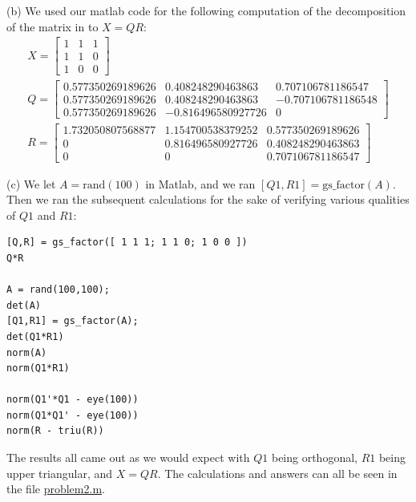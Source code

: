 \documentclass[12pt]{amsart}
\begin{document}
\begin{onehalfspace}
        (b) We used our matlab code for the following computation of the decomposition of the matrix in to $X=QR$:
        \begin{gather*}
            X  =  \left[\begin{matrix}
                          1 & 1 & 1\\
                          1 & 1 & 0\\
                          1 & 0 & 0
            \end{matrix}\right] \\
            Q  =  \left[\begin{matrix}
                      0.577350269189626 & 0.408248290463863 & 0.707106781186547\\
                      0.577350269189626 & 0.408248290463863 & -0.707106781186548\\
                      0.577350269189626 & -0.816496580927726 &                 0
            \end{matrix}\right]\\
            R  =  \left[\begin{matrix}
                      1.732050807568877 &   1.154700538379252 &   0.577350269189626\\
                      0  &  0.816496580927726 &   0.408248290463863\\
                      0  &                 0  &  0.707106781186547
            \end{matrix}\right]
        \end{gather*}

        (c) We let $A=\text{rand}(100)$ in Matlab, and we ran $[Q1, R1]=\text{gs\_factor}(A)$. Then we ran the subsequent
        calculations for the sake of verifying various qualities of $Q1$ and $R1$:
        \begin{tiny}
        \begin{verbatim}
[Q,R] = gs_factor([ 1 1 1; 1 1 0; 1 0 0 ])
Q*R

A = rand(100,100);
det(A)
[Q1,R1] = gs_factor(A);
det(Q1*R1)
norm(A)
norm(Q1*R1)

norm(Q1'*Q1 - eye(100))
norm(Q1*Q1' - eye(100))
norm(R - triu(R))
        \end{verbatim}
        \end{tiny}
        The results all came out as we would expect with $Q1$ being orthogonal, $R1$ being upper triangular, and
        $X=QR$.
        The calculations and answers can all be seen in the file
        \href{https://github.com/chtompki/MathSpring2026/blob/main/NumericalAnalysis/GuidedLab2/problem2.m}{problem2.m}.


\end{onehalfspace}
\end{document}
